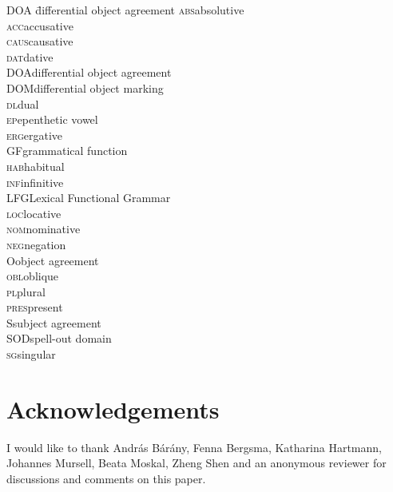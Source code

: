 \documentclass[output=paper
,modfonts
,nonflat]{langsci/langscibook}
\begin{document}
\begin{multicols}{2}
	\begin{tabbing}
		\textsc{DOA}\hspace{5mm} \= differential object agreement\kill
		\textsc{abs}\>absolutive\\
		\textsc{acc}\>accusative\\
		\textsc{caus}\>causative\\
		\textsc{dat}\>dative\\
		\textsc{DOA}\>differential object agreement\\
		\textsc{DOM}\>differential object marking\\
		\textsc{dl}\>dual\\
		\textsc{ep}\>epenthetic vowel\\
		\textsc{erg}\>ergative\\
		\textsc{GF}\>grammatical function\\
		\textsc{hab}\>habitual\\
		\textsc{inf}\>infinitive\\
		\textsc{LFG}\>Lexical Functional Grammar\\
		\textsc{loc}\>locative\\
		\textsc{nom}\>nominative\\
		\textsc{neg}\>negation\\
		O\>object agreement\\
		\textsc{obl}\>oblique\\
		\textsc{pl}\>plural\\
		\textsc{pres}\>present\\
		S\>subject agreement\\
		SOD\>spell-out domain\\
		\textsc{sg}\>singular\\
	\end{tabbing}
\end{multicols}

\section*{Acknowledgements}

I would like to thank András Bárány, Fenna Bergsma, Katharina Hartmann, Johannes Mursell, Beata Moskal, Zheng Shen and an anonymous reviewer for discussions and comments on this paper.


{\sloppy
\printbibliography[heading=subbibliography,notkeyword=this]
}
\end{document}

